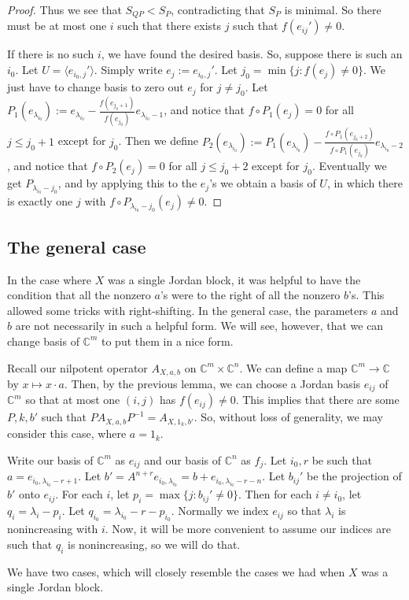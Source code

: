 \documentclass[12pt,psamsfonts]{article}
\begin{document}
\begin{proof}
    Thus we see that \(S_{QP} < S_P\), contradicting that \(S_P\) is minimal.
    So there must be at most one \(i\) such that there exists \(j\) such that \(f(e_{ij}') \neq 0\).
    \par If there is no such \(i\), we have found the desired basis.
    So, suppose there is such an \(i_0\).
    Let \(U = \langle e_{i_0, j}' \rangle\).
    Simply write \(e_j := e_{i_0, j}'\).
    Let \(j_0 = \min\{j : f(e_j) \neq 0\}\).
    We just have to change basis to zero out \(e_j\) for \(j \neq j_0\).
    Let \(P_1(e_{\lambda_{i_0}}) := e_{\lambda_{i_0}} - \frac{f(e_{j_0 + 1})}{f(e_{j_0})} e_{\lambda_{i_0} - 1}\), and notice that \(f \circ P_1(e_j) = 0\) for all \(j \leq j_0 + 1\) except for \(j_0\).
    Then we define \(P_2(e_{\lambda_{i_0}}) := P_1(e_{\lambda_{i_0}}) - \frac{f\circ P_1(e_{j_0 + 2})}{f\circ P_1(e_{j_0})} e_{\lambda_{i_0} - 2}\), and notice that \(f \circ P_2(e_j) = 0\) for all \(j \leq j_0 + 2\) except for \(j_0\).    
    Eventually we get \(P_{\lambda_{i_0} - j_0}\), and by applying this to the \(e_j\)'s we obtain a basis of \(U\), in which there is exactly one \(j\) with \(f \circ P_{\lambda_{i_0} - j_0}(e_j) \neq 0\).
\end{proof}

\subsection{The general case}
In the case where \(X\) was a single Jordan block, it was helpful to have the condition that all the nonzero \(a\)'s were to the right of all the nonzero \(b\)'s.
This allowed some tricks with right-shifting.
In the general case, the parameters \(a\) and \(b\) are not necessarily in such a helpful form.
We will see, however, that we can change basis of \(\mathbb{C}^m\) to put them in a nice form.
\par Recall our nilpotent operator \(A_{X, a, b}\) on \(\mathbb{C}^m \times \mathbb{C}^n\).
We can define a map \(\mathbb{C}^m \to \mathbb{C}\) by \(x \mapsto x \cdot a\).
Then, by the previous lemma, we can choose a Jordan basis \(e_{ij}\) of \(\mathbb{C}^m\) so that at most one \((i, j)\) has \(f(e_{ij}) \neq 0\).
This implies that there are some \(P, k, b'\) such that \(PA_{X, a, b}P^{-1} = A_{X, 1_k, b'}\).
So, without loss of generality, we may consider this case, where \(a = 1_k\).
\par Write our basis of \(\mathbb{C}^m\) as \(e_{ij}\) and our basis of \(\mathbb{C}^n\) as \(f_j\).
Let \(i_0, r\) be such that \(a = e_{i_0, \lambda_{i_0} - r + 1}\).
Let \(b' = A^{n + r} e_{i_0, \lambda_{i_0}} = b + e_{i_0, \lambda_{i_0} - r - n}\).
Let \(b_{ij}'\) be the projection of \(b'\) onto \(e_{ij}\).
For each \(i\), let \(p_i = \max\{j : b_{ij}' \neq 0\}\).
Then for each \(i \neq i_0\), let \(q_i = \lambda_i - p_i\).  Let \(q_{i_0} = \lambda_{i_0} - r - p_{i_0}\).
Normally we index \(e_{ij}\) so that \(\lambda_i\) is nonincreasing with \(i\).
Now, it will be more convenient to assume our indices are such that \(q_i\) is nonincreasing, so we will do that.
\par We have two cases, which will closely resemble the cases we had when \(X\) was a single Jordan block.
\end{document}
